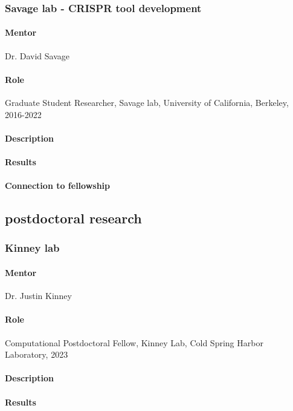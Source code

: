\documentclass[11pt]{article}
\begin{document}
\subsubsection{Savage lab - CRISPR tool development}
\begin{refsection}
%
\paragraph{Mentor}
Dr. David Savage
%
\paragraph{Role}
Graduate Student Researcher, Savage lab, University of California, Berkeley, 2016-2022
%
\paragraph{Description}
%
\paragraph{Results}
%
\paragraph{Connection to fellowship}
%
\nocite{Liu2019-nk,Liu2021-pu}
\printbibliography[heading=none]
\end{refsection}
%
\subsection{postdoctoral research}
\subsubsection{Kinney lab}
%
\paragraph{Mentor}
Dr. Justin Kinney
%
\paragraph{Role}
Computational Postdoctoral Fellow, Kinney Lab, Cold Spring Harbor Laboratory, 2023
%
\paragraph{Description}
%
\paragraph{Results}
%
\end{document}
